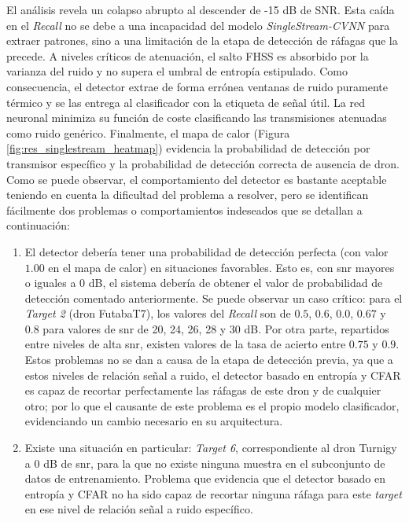 El análisis revela un colapso abrupto al descender de -15 dB de SNR. Esta caída en el \textit{Recall} no se debe a una incapacidad del modelo \textit{SingleStream-CVNN} para extraer patrones, sino a una limitación de la etapa de detección de ráfagas que la precede. A niveles críticos de atenuación, el salto FHSS es absorbido por la varianza del ruido y no supera el umbral de entropía estipulado. Como consecuencia, el detector extrae de forma errónea ventanas de ruido puramente térmico y se las entrega al clasificador con la etiqueta de señal útil. La red neuronal minimiza su función de coste clasificando las transmisiones atenuadas como ruido genérico. 
Finalmente, el mapa de calor (Figura \ref{fig:res_singlestream_heatmap}) evidencia la probabilidad de detección por transmisor específico y la probabilidad de detección correcta de ausencia de dron. Como se puede observar, el comportamiento del detector es bastante aceptable teniendo en cuenta la dificultad del problema a resolver, pero se identifican fácilmente dos problemas o comportamientos indeseados que se detallan a continuación:

\begin{enumerate}\itemsep 0em
    \item El detector debería tener una probabilidad de detección perfecta (con valor $1.00$ en el mapa de calor) en situaciones favorables. Esto es, con \gls{snr} mayores o iguales a $0$ dB, el sistema debería de obtener el valor de probabilidad de detección comentado anteriormente. Se puede observar un caso crítico: para el \textit{Target 2} (dron FutabaT7), los valores del \textit{Recall} son de $0.5$, $0.6$, $0.0$, $0.67$ y $0.8$ para valores de \gls{snr} de 20, 24, 26, 28 y 30 dB. Por otra parte, repartidos entre niveles de alta \gls{snr}, existen valores de la tasa de acierto entre $0.75$ y $0.9$. Estos problemas no se dan a causa de la etapa de detección previa, ya que a estos niveles de relación señal a ruido, el detector basado en entropía y CFAR es capaz de recortar perfectamente las ráfagas de este dron y de cualquier otro; por lo que el causante de este problema es el propio modelo clasificador, evidenciando un cambio necesario en su arquitectura.

    \item Existe una situación en particular: \textit{Target 6}, correspondiente al dron Turnigy a $0$ dB de \gls{snr}, para la que no existe ninguna muestra en el subconjunto de datos de entrenamiento. Problema que evidencia que el detector basado en entropía y CFAR no ha sido capaz de recortar ninguna ráfaga para este \textit{target} en ese nivel de relación señal a ruido específico. 
\end{enumerate}

